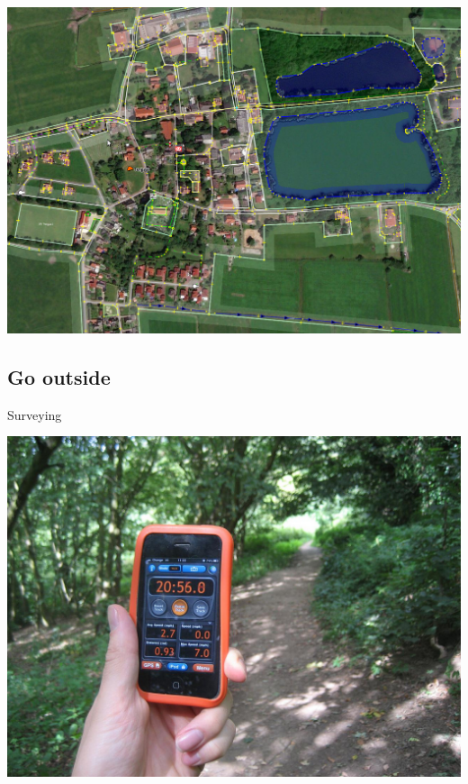 \documentclass{beamer}
\begin{document}
	\begin{frame}
		\begin{center}
			\includegraphics[width=0.9\linewidth,height=0.9\textheight,keepaspectratio]{images/trace_imagery.png}
		\end{center}
	\end{frame}
	
	\subsection{Go outside}
	
	\begin{frame}{Surveying}
		\begin{center}
			\includegraphics[width=0.8\linewidth,height=0.8\textheight,keepaspectratio]{images/surveying}
		\end{center}
	\end{frame}
\end{document}
